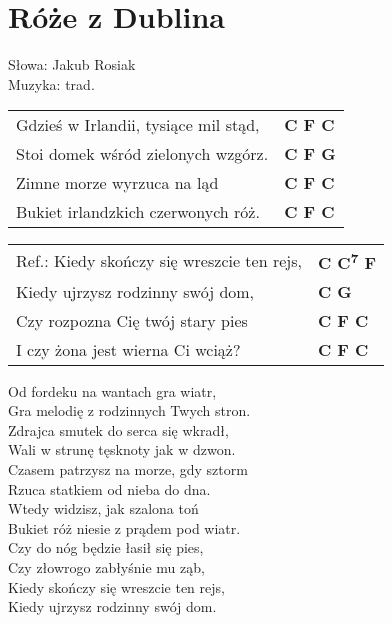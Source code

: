 \section{Róże z Dublina}

Słowa: Jakub Rosiak\\
Muzyka:  trad.

\vspace{2em}
\begin{tabular}{@{}p{7cm}@{}l@{}}
Gdzieś w Irlandii, tysiące mil stąd, & \bfseries C F C \\
Stoi domek wśród zielonych wzgórz. & \bfseries C F G \\
Zimne morze wyrzuca na ląd & \bfseries C F C \\
Bukiet irlandzkich czerwonych róż. & \bfseries C F C \\
\end{tabular}

\vspace{1em}
\begin{tabular}{@{}p{7cm}@{}l@{}}
Ref.: Kiedy skończy się wreszcie ten rejs, & \bfseries C C\textsuperscript{7} F \\
Kiedy ujrzysz rodzinny swój dom, & \bfseries C G \\
Czy rozpozna Cię twój stary pies & \bfseries C F C \\
I czy żona jest wierna Ci wciąż? & \bfseries C F C \\
\end{tabular}

\vspace{1em}
Od fordeku na wantach gra wiatr, \\
Gra melodię z rodzinnych Twych stron. \\
Zdrajca smutek do serca się wkradł, \\
Wali w strunę tęsknoty jak w dzwon. \\

Czasem patrzysz na morze, gdy sztorm \\
Rzuca statkiem od nieba do dna. \\
Wtedy widzisz, jak szalona toń \\
Bukiet róż niesie z prądem pod wiatr. \\

Czy do nóg będzie łasił się pies, \\
Czy złowrogo zabłyśnie mu ząb, \\
Kiedy skończy się wreszcie ten rejs, \\
Kiedy ujrzysz rodzinny swój dom. \\